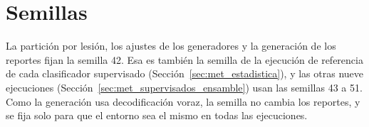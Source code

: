 \section{Semillas}
\label{sec:ap_semillas}

La partición por lesión, los ajustes de los generadores y la generación de los reportes fijan la semilla 42. Esa es también
la semilla de la ejecución de referencia de cada clasificador supervisado (Sección~\ref{sec:met_estadistica}), y las
otras nueve ejecuciones (Sección~\ref{sec:met_supervisados_ensamble}) usan las semillas 43 a 51. Como la generación usa
decodificación voraz, la semilla no cambia los reportes, y se fija solo para que el entorno sea el mismo en todas las
ejecuciones.
